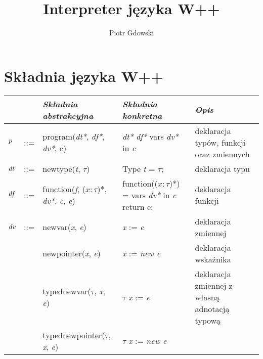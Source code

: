 \documentclass{article}
\begin{document}
\title{\textbf{Interpreter języka W++}}
\date{}
\author{Piotr Gdowski}

\maketitle
\section{Składnia języka W++}
\begin{table}[H]
    \centering
    \vspace{1pt}
    \begin{tabular}{lllp{3.5cm}p{5.6cm}}
                    &     & \emph{Składnia abstrakcyjna}                     & \emph{Składnia konkretna}                            
           & \emph{Opis}\\ \hline
        $\emph{p}$  & ::= & program(\emph{dt*}, \emph{df*}, \emph{dv*}, c)                & \emph{dt*} \emph{df*} vars \emph{dv*} in \emph{c}             & deklaracja typów, funkcji oraz zmiennych \\
        $\emph{dt}$ & ::= & newtype(\emph{t}, \begin{math}\tau\end{math})                                              & Type \emph{t} = \begin{math}\tau\end{math};                                                & deklaracja typu \\
        $\emph{df}$ & ::= & function(\emph{f}, (${x : \tau}$)*, \emph{dv*}, \emph{c}, \emph{e}) & function((${x : \tau}$)*) = vars \emph{dv*} in {\emph{c}} return e; & deklaracja funkcji \\
        $\emph{dv}$ & ::= & newvar(\emph{x}, \emph{e})                                    & \emph{x} := \emph{e}                                          & deklaracja zmiennej \\
                    &     & newpointer(\emph{x}, \emph{e})                                & \emph{x} := \emph{new e}  
            & deklaracja wskaźnika \\ 
                    &     & typednewvar($\tau$, \emph{x}, \emph{e})                        & $\tau$ \emph{x} := \emph{e}                             
                    & deklaracja zmiennej z własną adnotacją typową\\
                    &     & typednewpointer($\tau$, \emph{x}, \emph{e})                   & $\tau$ \emph{x} := \emph{new e}                         

\end{tabular}
\end{table}
\end{document}
